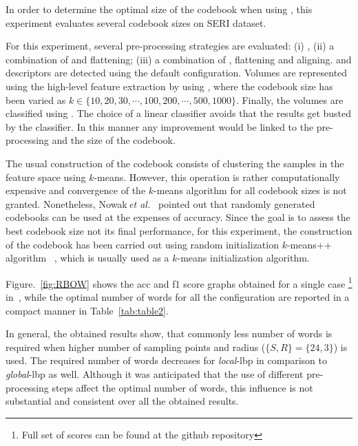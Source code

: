 In order to determine the optimal size of the codebook when using \bow, this experiment evaluates several codebook sizes on SERI dataset.

For this experiment, several pre-processing strategies are evaluated: (i) \nlm, (ii) a combination of \nlm and flattening; (iii) a combination of \nlm, flattening and aligning.
\lbp and \lbptop descriptors are detected using the default configuration.
Volumes are represented using the high-level feature extraction by using \bow, where the codebook size has been varied as $k \in \{10, 20, 30, \cdots, 100, 200, \cdots, 500, 1000\}$.
Finally, the volumes are classified using \lr. The choice of a linear classifier avoids that the results get busted by the classifier. In this manner any improvement would be linked to the pre-processing and the size of the codebook.




The usual construction of the codebook consists of clustering the samples in
the feature space using $k$-means. However, this operation is rather
computationally expensive and convergence of the $k$-means algorithm for all
codebook sizes is not granted.
Nonetheless, Nowak\,\textit{et al.}~\cite{nowak2006sampling} pointed out that randomly generated codebooks can be used at the expenses of accuracy.
Since the goal is to assess the best codebook size not its final performance, for this experiment, the construction of the codebook has been carried out using random initialization $k$-means++ algorithm ~\cite{arthur2007k}, which is usually used as a $k$-means initialization algorithm.

Figure.~\ref{fig:RBOW} shows the \ac{acc} and \ac{f1} score graphs obtained for a single case \footnote{Full set of scores can be found at the github repository} in~\cite{Lemaitre2015}, while the optimal number of words for all the configuration are reported in a compact manner in Table~\ref{tab:table2}.


In general, the obtained results show, that commonly less number of words is required when higher number of sampling points and radius ($\{S,R\} = \{24,3\}$) is used.
The required number of words decreases for \emph{local}-\ac{lbp} in comparison to \emph{global}-\ac{lbp} as well.
Although it was anticipated that the use of different pre-processing steps affect the optimal number of words, this influence is not substantial and consistent over all the obtained results.


